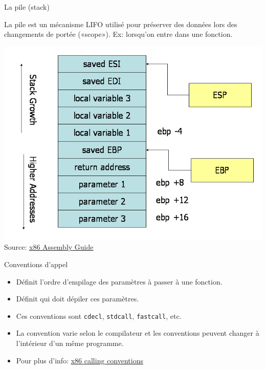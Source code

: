 \documentclass[10pt,xcolor={table,dvipsnames},t]{beamer}
\begin{document}
\begin{frame}{La pile (stack)}

La pile est un mécanisme LIFO utilisé pour préserver des données lors des changements de portée («scope»). Ex: lorsqu'on entre dans une fonction.

\begin{center}
\includegraphics[width=.60\textwidth,height=.56\textheight]{Stack-convention}\newline{}
Source: \href{https://www.cs.virginia.edu/~evans/cs216/guides/x86.html}{x86 Assembly Guide}
\end{center}

\end{frame}


\begin{frame}{Conventions d'appel}
    \begin{itemize}
        \item Définit l'ordre d'empilage des paramètres à passer à une fonction.
        \item Définit qui doit dépiler ces paramètres. 
        \item Ces conventions sont \texttt{cdecl}, \texttt{stdcall}, \texttt{fastcall}, etc.
        \item La convention varie selon le compilateur et les conventions peuvent changer à l'intérieur d'un même programme.
        \item Pour plus d'info: \href{https://en.wikipedia.org/wiki/X86_calling_conventions}{x86 calling conventions}
    \end{itemize}
\end{frame}
\end{document}
